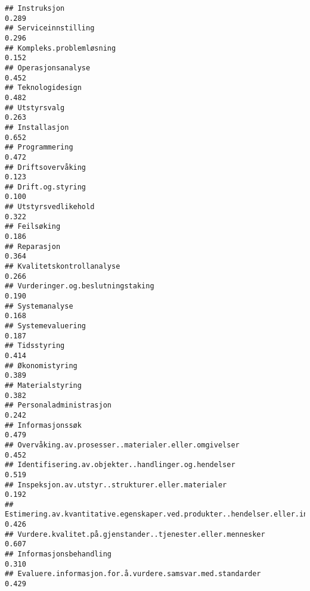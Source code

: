 \documentclass[
]{article}
\begin{document}
\begin{verbatim}
## Instruksjon                                                                      0.289
## Serviceinnstilling                                                               0.296
## Kompleks.problemløsning                                                          0.152
## Operasjonsanalyse                                                                0.452
## Teknologidesign                                                                  0.482
## Utstyrsvalg                                                                      0.263
## Installasjon                                                                     0.652
## Programmering                                                                    0.472
## Driftsovervåking                                                                 0.123
## Drift.og.styring                                                                 0.100
## Utstyrsvedlikehold                                                               0.322
## Feilsøking                                                                       0.186
## Reparasjon                                                                       0.364
## Kvalitetskontrollanalyse                                                         0.266
## Vurderinger.og.beslutningstaking                                                 0.190
## Systemanalyse                                                                    0.168
## Systemevaluering                                                                 0.187
## Tidsstyring                                                                      0.414
## Økonomistyring                                                                   0.389
## Materialstyring                                                                  0.382
## Personaladministrasjon                                                           0.242
## Informasjonssøk                                                                  0.479
## Overvåking.av.prosesser..materialer.eller.omgivelser                             0.452
## Identifisering.av.objekter..handlinger.og.hendelser                              0.519
## Inspeksjon.av.utstyr..strukturer.eller.materialer                                0.192
## Estimering.av.kvantitative.egenskaper.ved.produkter..hendelser.eller.informasjon 0.426
## Vurdere.kvalitet.på.gjenstander..tjenester.eller.mennesker                       0.607
## Informasjonsbehandling                                                           0.310
## Evaluere.informasjon.for.å.vurdere.samsvar.med.standarder                        0.429

\end{verbatim}
\end{document}
